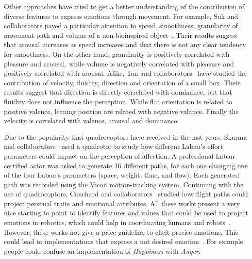 Other approaches have tried to get a better understanding of the contribution of diverse features to express emotions through movement. For example, Suk and collaborators payed a particular attention to speed, smoothness, granularity of movement path and volume of a non-bioinspired object~\cite{NAM2014}. Their results suggest that arousal increases as speed increases and that there is not any clear tendency for smoothness. On the other hand, granularity is positively correlated with pleasure and arousal, while volume is negatively correlated with pleasure and positively correlated with arousal. Alike, Tan and collaborators~\cite{Tan2016} have studied the contribution of velocity, fluidity, direction and orientation of a small box. Their results suggest that direction is directly correlated with dominance, but that fluidity does not influence the perception. While flat orientation is related to positive valence, leaning position are related with negative valance. Finally the velocity is correlated with valence, arousal and dominance.  

Due to the popularity that quadrocoptors have received in the last years, Sharma and collaborators~\cite{Sharma2013} used a quadrotor to study how different Laban's effort~\cite{Laban1968} parameters could impact on the perception of affection. A professional Laban certified actor was asked to generate 16 different paths, for each one changing one of the four Laban's parameters (space, weight, time, and flow). Each generated path was recorded using the Vicon motion-tracking system. Continuing with the use of quadrocoptors, Cauchard and collaborators~\cite{Cauchard2016} studied how flight paths could project personal traits and emotional attributes. All these works present a very nice starting to point to identify features and values that could be used to project emotions in robotics, which could help in coordinating humans and robots~\cite{Novika2015}. However, these works not give a price guideline to elicit precise emotions. This could lead to implementations that express a not desired emotion~\cite{Angel2016}. For example people could confuse an implementation of \textit{Happiness} with \textit{Anger}.